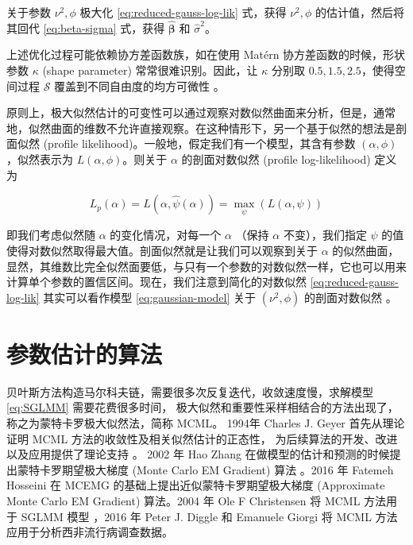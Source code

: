 \documentclass[12pt,a4paper,UTF8,twoside]{book}
\theoremstyle{definition}
\theoremstyle{definition}
\theoremstyle{definition}
\theoremstyle{remark}
\begin{document}
关于参数 \(\nu^2,\phi\) 极大化 \eqref{eq:reduced-gauss-log-lik} 式，获得
\(\nu^2,\phi\) 的估计值，然后将其回代 \eqref{eq:beta-sigma} 式，获得
\(\hat{\boldsymbol{\beta}}\) 和 \(\hat{\sigma}^2\)。

上述优化过程可能依赖协方差函数族，如在使用 Matérn
协方差函数的时候，形状参数 \(\kappa\) (shape parameter)
常常很难识别。因此，让 \(\kappa\) 分别取 \(0.5,1.5,2.5\)，使得空间过程
\(\mathcal{S}\) 覆盖到不同自由度的均方可微性 \citep{Warnes1987}。

原则上，极大似然估计的可变性可以通过观察对数似然曲面来分析，但是，通常地，似然曲面的维数不允许直接观察。在这种情形下，另一个基于似然的想法是剖面似然
(profile likelihood)。一般地，假定我们有一个模型，其含有参数
\((\alpha,\phi)\)，似然表示为 \(L(\alpha,\phi)\)。则关于 \(\alpha\)
的剖面对数似然 (profile log-likelihood) 定义为

\begin{equation}
L_{p}(\alpha) = L(\alpha,\hat{\psi}(\alpha)) = \max_{\psi} (L(\alpha,\psi))
\label{eq:profile-log-lik}
\end{equation}

即我们考虑似然随 \(\alpha\) 的变化情况，对每一个 \(\alpha\) （保持
\(\alpha\) 不变），我们指定 \(\psi\)
的值使得对数似然取得最大值。剖面似然就是让我们可以观察到关于 \(\alpha\)
的似然曲面，显然，其维数比完全似然面要低，与只有一个参数的对数似然一样，它也可以用来计算单个参数的置信区间。现在，我们注意到简化的对数似然
\eqref{eq:reduced-gauss-log-lik} 其实可以看作模型 \eqref{eq:gaussian-model}
关于 \((\nu^2,\phi)\) 的剖面对数似然 \citep{Diggle2007}。

\hypertarget{algrithms}{%
\section{参数估计的算法}\label{algrithms}}

贝叶斯方法构造马尔科夫链，需要很多次反复迭代，收敛速度慢，求解模型
\eqref{eq:SGLMM} 需要花费很多时间，
极大似然和重要性采样相结合的方法出现了，称之为蒙特卡罗极大似然法，简称
MCML。 1994年 Charles J. Geyer 首先从理论证明 MCML
方法的收敛性及相关似然估计的正态性，
为后续算法的开发、改进以及应用提供了理论支持 \citep{Geyer1994On}。 2002
年 Hao Zhang 在做模型的估计和预测的时候提出蒙特卡罗期望极大梯度 (Monte
Carlo EM Gradient) 算法 \citep{Zhang2002On}。2016 年 Fatemeh Hosseini 在
MCEMG 的基础上提出近似蒙特卡罗期望极大梯度 (Approximate Monte Carlo EM
Gradient) 算法\citep{Hosseini2016}。2004 年 Ole F Christensen 将 MCML
方法用于 SGLMM 模型 \citep{Christensen2004}，2016 年 Peter J. Diggle 和
Emanuele Giorgi 将 MCML 方法应用于分析西非流行病调查数据。
\end{document}
